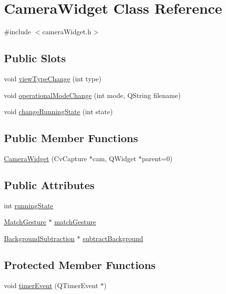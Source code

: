 \hypertarget{classCameraWidget}{
\section{CameraWidget Class Reference}
\label{classCameraWidget}
}


{\ttfamily \#include $<$cameraWidget.h$>$}

\subsection*{Public Slots}
\begin{DoxyCompactItemize}
\item 
void \hyperlink{classCameraWidget_a7d08d12d114c7bd9e4b92ae605742188}{viewTypeChange} (int type)
\item 
void \hyperlink{classCameraWidget_afd21e680e172d0ed95d328a5addea3b0}{operationalModeChange} (int mode, QString filename)
\item 
void \hyperlink{classCameraWidget_a2d5829477a10b5a0f41fd37917e69fe6}{changeRunningState} (int state)
\end{DoxyCompactItemize}
\subsection*{Public Member Functions}
\begin{DoxyCompactItemize}
\item 
\hyperlink{classCameraWidget_aa843e6a42438150fa9e4e60b8fc7e4f4}{CameraWidget} (CvCapture $\ast$cam, QWidget $\ast$parent=0)
\end{DoxyCompactItemize}
\subsection*{Public Attributes}
\begin{DoxyCompactItemize}
\item 
int \hyperlink{classCameraWidget_a76aca1e4016b0365c643993322b93b47}{runningState}
\item 
\hyperlink{classMatchGesture}{MatchGesture} $\ast$ \hyperlink{classCameraWidget_a7107e471a359c2577f9dfac50969d635}{matchGesture}
\item 
\hyperlink{classBackgroundSubtraction}{BackgroundSubtraction} $\ast$ \hyperlink{classCameraWidget_a395a84c275e7b80005f0fa8193b136b2}{subtractBackground}
\end{DoxyCompactItemize}
\subsection*{Protected Member Functions}
\begin{DoxyCompactItemize}
\item 
void \hyperlink{classCameraWidget_a1714b8ae14b664e00b7b4cf873258bfc}{timerEvent} (QTimerEvent $\ast$)
\end{DoxyCompactItemize}
